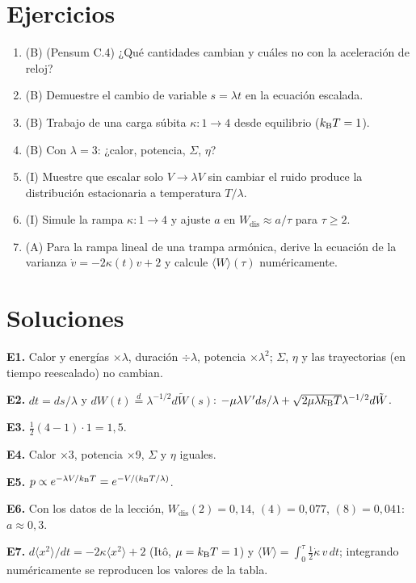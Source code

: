 \documentclass[11pt,a4paper]{article}
\begin{document}
\section{Ejercicios}
\begin{enumerate}[label=\textbf{E\arabic*.}]
\item (B) (Pensum C.4) ¿Qué cantidades cambian y cuáles no con la aceleración de reloj?
\item (B) Demuestre el cambio de variable $s=\lambda t$ en la ecuación escalada.
\item (B) Trabajo de una carga súbita $\kappa:1\to4$ desde equilibrio ($k_{\mathrm B} T=1$).
\item (B) Con $\lambda=3$: ¿calor, potencia, $\Sigma$, $\eta$?
\item (I) Muestre que escalar solo $V\to\lambda V$ sin cambiar el ruido produce la distribución estacionaria a temperatura $T/\lambda$.
\item (I) Simule la rampa $\kappa:1\to4$ y ajuste $a$ en $W_{\text{dis}}\approx a/\tau$ para $\tau\ge2$.
\item (A) Para la rampa lineal de una trampa armónica, derive la ecuación de la varianza $\dot v=-2\kappa(t)v+2$ y calcule $\langle W\rangle(\tau)$ numéricamente.
\end{enumerate}
\section{Soluciones}
\begin{solucion}
\textbf{E1.} Calor y energías $\times\lambda$, duración $\div\lambda$, potencia $\times\lambda^2$; $\Sigma$, $\eta$ y las trayectorias (en tiempo reescalado) no cambian.

\textbf{E2.} $dt=ds/\lambda$ y $dW(t)\overset{d}{=}\lambda^{-1/2}d\tilde W(s)$: $-\mu\lambda V'ds/\lambda+\sqrt{2\mu\lambda k_{\mathrm B} T}\lambda^{-1/2}d\tilde W$.

\textbf{E3.} $\frac12(4-1)\cdot1=1{,}5$.

\textbf{E4.} Calor ×3, potencia ×9, $\Sigma$ y $\eta$ iguales.

\textbf{E5.} $p\propto e^{-\lambda V/k_{\mathrm B} T}=e^{-V/(k_{\mathrm B} T/\lambda)}$.

\textbf{E6.} Con los datos de la lección, $W_{\text{dis}}(2)=0{,}14$, $(4)=0{,}077$, $(8)=0{,}041$: $a\approx0{,}3$.

\textbf{E7.} $d\langle x^2\rangle/dt=-2\kappa\langle x^2\rangle+2$ (Itô, $\mu=k_{\mathrm B} T=1$) y $\langle W\rangle=\int_0^\tau\frac12\dot\kappa\,v\,dt$; integrando numéricamente se reproducen los valores de la tabla.
\end{solucion}
\end{document}
